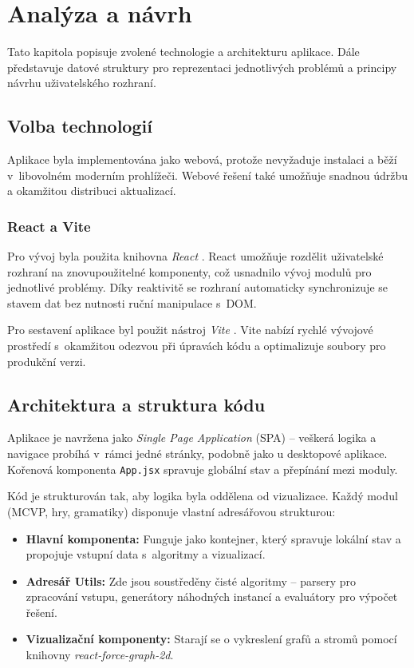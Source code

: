 \chapter{Analýza a návrh}
\label{sec:AnalysisAndDesign}

Tato kapitola popisuje zvolené technologie a architekturu aplikace. Dále představuje datové struktury pro reprezentaci jednotlivých problémů a principy návrhu uživatelského rozhraní.

\section{Volba technologií}
\label{sec:WebTechnologies}

Aplikace byla implementována jako webová, protože nevyžaduje instalaci a běží v~libovolném moderním prohlížeči. Webové řešení také umožňuje snadnou údržbu a okamžitou distribuci aktualizací.

\subsection{React a Vite}
\label{sec:ReactVite}

Pro vývoj byla použita knihovna \emph{React} \cite{react2024}. React umožňuje rozdělit uživatelské rozhraní na znovupoužitelné komponenty, což usnadnilo vývoj modulů pro jednotlivé problémy. Díky reaktivitě se rozhraní automaticky synchronizuje se stavem dat bez nutnosti ruční manipulace s~DOM.

Pro sestavení aplikace byl použit nástroj \emph{Vite} \cite{vite2024}. Vite nabízí rychlé vývojové prostředí s~okamžitou odezvou při úpravách kódu a optimalizuje soubory pro produkční verzi.

\section{Architektura a struktura kódu}
\label{sec:ComponentArchitecture}

Aplikace je navržena jako \emph{Single Page Application} (SPA) – veškerá logika a navigace probíhá v~rámci jedné stránky, podobně jako u desktopové aplikace. Kořenová komponenta \texttt{App.jsx} spravuje globální stav a přepínání mezi moduly.

Kód je strukturován tak, aby logika byla oddělena od vizualizace. Každý modul (MCVP, hry, gramatiky) disponuje vlastní adresářovou strukturou:
\begin{itemize}
    \item \textbf{Hlavní komponenta:} Funguje jako kontejner, který spravuje lokální stav a propojuje vstupní data s~algoritmy a vizualizací.
    \item \textbf{Adresář Utils:} Zde jsou soustředěny čisté algoritmy – parsery pro zpracování vstupu, generátory náhodných instancí a evaluátory pro výpočet řešení.
    \item \textbf{Vizualizační komponenty:} Starají se o vykreslení grafů a stromů pomocí knihovny \emph{react-force-graph-2d}.
\end{itemize}

